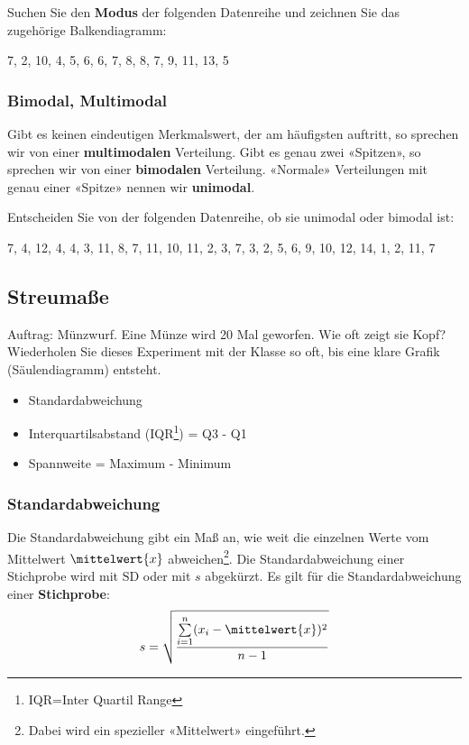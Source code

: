 Suchen Sie den \textbf{Modus} der folgenden Datenreihe und zeichnen Sie das
zugehörige Balkendiagramm:

7, 2, 10,  4, 5, 6, 6, 7, 8, 8, 7, 9, 11, 13, 5


\newpage
\subsubsection{Bimodal, Multimodal}
Gibt es keinen eindeutigen Merkmalswert, der am häufigsten auftritt,
so sprechen wir von einer \textbf{multimodalen} Verteilung. Gibt es
genau zwei «Spitzen», so sprechen wir von einer \textbf{bimodalen}
Verteilung. «Normale» Verteilungen mit genau einer «Spitze» nennen wir \textbf{unimodal}.



Entscheiden Sie von der folgenden Datenreihe, ob sie unimodal oder
bimodal ist:

7, 4, 12, 4, 4, 3,  11, 8, 7, 11, 10, 11, 2, 3, 7, 3, 2, 5, 6, 9, 10, 12, 14, 1, 2, 11, 7

\newpage

\subsection{Streumaße}
Auftrag: Münzwurf. Eine Münze wird 20 Mal geworfen. Wie oft zeigt sie Kopf? Wiederholen Sie dieses Experiment mit der Klasse so oft, bis eine klare Grafik (Säulendiagramm) entsteht.


\begin{itemize}
\item Standardabweichung

\item Interquartilsabstand (IQR\footnote{IQR=Inter Quartil
    Range}) = Q3 - Q1

\item Spannweite = Maximum - Minimum

\end{itemize}

\subsubsection{Standardabweichung}
Die Standardabweichung gibt ein Maß an, wie weit die einzelnen Werte
vom Mittelwert $\mittelwert{x}$ abweichen\footnote{Dabei wird ein spezieller «Mittelwert»
  eingeführt.}.
Die Standardabweichung einer Stichprobe wird mit $\textrm{SD}$ oder
mit $s$ abgekürzt. Es gilt für die Standardabweichung einer
\textbf{Stichprobe}:
$$s = \sqrt{\frac{\sum\limits_{i=1}^n(x_i-\mittelwert{x})^2}{n-1}}$$

